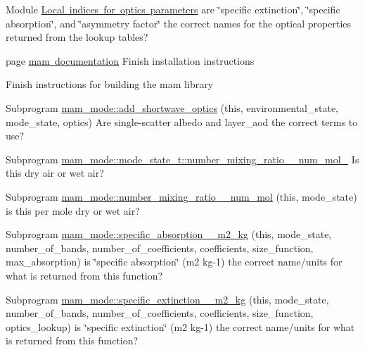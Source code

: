 
\begin{DoxyRefList}
\item[Module \mbox{\hyperlink{namespacemam__optics__lookup_amgrp1d1234ebe5af757beddabdb4075372a5}{Local indices for optics parameters}} ]\label{todo__todo000010}%
%
are \char`\"{}specific extinction\char`\"{}, \char`\"{}specific absorption\char`\"{}, and \char`\"{}asymmetry factor\char`\"{} the correct names for the optical properties returned from the lookup tables?


\item[page \mbox{\hyperlink{index}{mam documentation}} ]\label{todo__todo000001}%
%
Finish installation instructions

\label{todo__todo000002}%
%
Finish instructions for building the mam library 
\item[Subprogram \mbox{\hyperlink{namespacemam__mode_ab9b38f854035795ee9ca700c989e93a4}{mam\+\_\+mode\+::add\+\_\+shortwave\+\_\+optics}} (this, environmental\+\_\+state, mode\+\_\+state, optics)]\label{todo__todo000004}%
%
Are single-\/scatter albedo and layer\+\_\+aod the correct terms to use?  
\item[Subprogram \mbox{\hyperlink{structmam__mode_1_1mode__state__t_a7ac10b68c2ff25b49d2cda9825adc915}{mam\+\_\+mode\+::mode\+\_\+state\+\_\+t\+::number\+\_\+mixing\+\_\+ratio\+\_\+\+\_\+num\+\_\+mol\+\_\+}} ]\label{todo__todo000003}%
%
Is this dry air or wet air?  
\item[Subprogram \mbox{\hyperlink{namespacemam__mode_a9b672a9f0c3a4eff42da6c9187117c2f}{mam\+\_\+mode\+::number\+\_\+mixing\+\_\+ratio\+\_\+\+\_\+num\+\_\+mol}} (this, mode\+\_\+state)]\label{todo__todo000005}%
%
is this per mole dry or wet air?  
\item[Subprogram \mbox{\hyperlink{namespacemam__mode_a7a7ccd5c378b5181b4bcbe5f2c5a2e6c}{mam\+\_\+mode\+::specific\+\_\+absorption\+\_\+\+\_\+m2\+\_\+kg}} (this, mode\+\_\+state, number\+\_\+of\+\_\+bands, number\+\_\+of\+\_\+coefficients, coefficients, size\+\_\+function, max\+\_\+absorption)]\label{todo__todo000006}%
%
is \char`\"{}specific absorption\char`\"{} (m2 kg-\/1) the correct name/units for what is returned from this function?  
\item[Subprogram \mbox{\hyperlink{namespacemam__mode_aa0ed60cc0da1e1bf74ee66e8d83106ef}{mam\+\_\+mode\+::specific\+\_\+extinction\+\_\+\+\_\+m2\+\_\+kg}} (this, mode\+\_\+state, number\+\_\+of\+\_\+bands, number\+\_\+of\+\_\+coefficients, coefficients, size\+\_\+function, optics\+\_\+lookup)]\label{todo__todo000007}%
%
is \char`\"{}specific extinction\char`\"{} (m2 kg-\/1) the correct name/units for what is returned from this function? 


\end{DoxyRefList}
